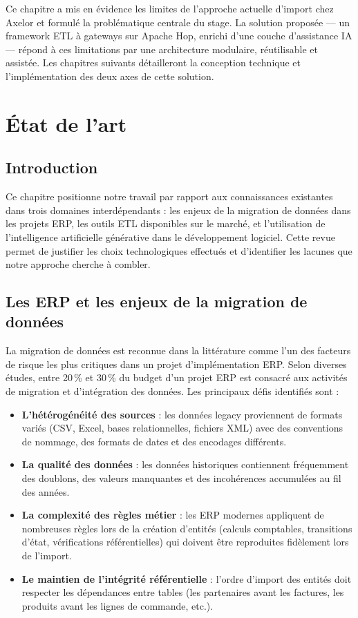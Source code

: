 \documentclass[a4paper,12pt]{article}
\begin{document}
Ce chapitre a mis en évidence les limites de l'approche actuelle d'import chez Axelor et formulé la problématique centrale du stage. La solution proposée — un framework ETL à gateways sur Apache Hop, enrichi d'une couche d'assistance IA — répond à ces limitations par une architecture modulaire, réutilisable et assistée. Les chapitres suivants détailleront la conception technique et l'implémentation des deux axes de cette solution.

\newpage
\section{État de l'art}

\subsection{Introduction}

Ce chapitre positionne notre travail par rapport aux connaissances existantes dans trois domaines interdépendants : les enjeux de la migration de données dans les projets ERP, les outils ETL disponibles sur le marché, et l'utilisation de l'intelligence artificielle générative dans le développement logiciel. Cette revue permet de justifier les choix technologiques effectués et d'identifier les lacunes que notre approche cherche à combler.

\subsection{Les ERP et les enjeux de la migration de données}

La migration de données est reconnue dans la littérature comme l'un des facteurs de risque les plus critiques dans un projet d'implémentation ERP. Selon diverses études, entre 20\,\% et 30\,\% du budget d'un projet ERP est consacré aux activités de migration et d'intégration des données. Les principaux défis identifiés sont :

\begin{itemize}
  \item \textbf{L'hétérogénéité des sources} : les données legacy proviennent de formats variés (CSV, Excel, bases relationnelles, fichiers XML) avec des conventions de nommage, des formats de dates et des encodages différents.
  \item \textbf{La qualité des données} : les données historiques contiennent fréquemment des doublons, des valeurs manquantes et des incohérences accumulées au fil des années.
  \item \textbf{La complexité des règles métier} : les ERP modernes appliquent de nombreuses règles lors de la création d'entités (calculs comptables, transitions d'état, vérifications référentielles) qui doivent être reproduites fidèlement lors de l'import.
  \item \textbf{Le maintien de l'intégrité référentielle} : l'ordre d'import des entités doit respecter les dépendances entre tables (les partenaires avant les factures, les produits avant les lignes de commande, etc.).
\end{itemize}
\end{document}
